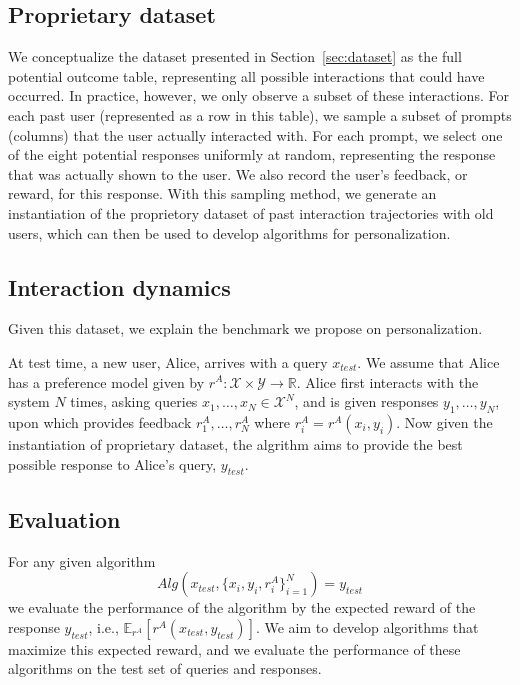 \subsection{Proprietary dataset}
We conceptualize the dataset presented in Section~\ref{sec:dataset} as the full potential outcome table, representing all possible interactions that could have occurred. In practice, however, we only observe a subset of these interactions. For each past user (represented as a row in this table), we sample a subset of prompts (columns) that the user actually interacted with. For each prompt, we select one of the eight potential responses uniformly at random, representing the response that was actually shown to the user. We also record the user's feedback, or reward, for this response. With this sampling method, we generate an instantiation of the proprietory dataset of past interaction trajectories with old users, which can then be used to develop algorithms for personalization. 


\subsection{Interaction dynamics}
Given this dataset, we explain the benchmark we propose on personalization. 

At test time, a new user, Alice, arrives with a query $x_{test}$. We assume that Alice has a preference model given by $r^A: \mathcal{X} \times \mathcal{Y} \rightarrow \mathbb{R}$. Alice first interacts with the system $N$ times, asking queries $x_1, \dots, x_N\in \mathcal{X}^N$, and is given responses $y_1,\dots, y_N$, upon which provides feedback $r^A_1,\dots, r^A_N$ where $r_i^A = r^A(x_i,y_i)$. Now given the instantiation of proprietary dataset, the algrithm aims to provide the best possible response to Alice's query, $y_{test}$.


\subsection{Evaluation}
For any given algorithm
\[{Alg}\left(x_{test}, \{x_i,y_i,r^A_i\}_{i=1}^N\right) = y_{test}\]
we evaluate the performance of the algorithm by the expected reward of the response $y_{test}$, i.e., $\mathbb{E}_{r^A}\left[r^A(x_{test},y_{test})\right]$. We aim to develop algorithms that maximize this expected reward, and we evaluate the performance of these algorithms on the test set of queries and responses.